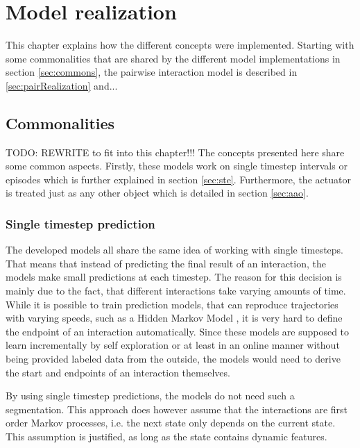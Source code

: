 \chapter{Model realization\label{chap:modelReal}}

This chapter explains how the different concepts were implemented. Starting 
with some commonalities that are shared by the different model implementations in section 
\ref{sec:commons}, the pairwise interaction model is described in 
\ref{sec:pairRealization} and... %


\section{Commonalities\label{sec:commons}}
TODO: REWRITE to fit into this chapter!!! %
The concepts presented here share some common aspects. Firstly, these models 
work on single timestep
intervals or episodes which is further explained in section \ref{sec:ste}. 
Furthermore, the actuator
is treated just as any other object which is detailed in section \ref{sec:aao}.

\subsection{Single timestep prediction\label{sec:ste}}

The developed models all share the same idea of working with single timesteps. That means that 
instead of predicting the final result of an interaction, the models make small predictions at each 
timestep. The reason for this decision is mainly due to the fact, that different interactions take 
varying amounts of time. While it is possible to train prediction models, that can reproduce 
trajectories with varying speeds, such as a Hidden Markov Model \cite{hmm}, it is very hard to 
define the endpoint of an interaction automatically. Since these models are supposed to learn 
incrementally by self exploration or at least in an online manner without being provided labeled 
data from the outside, the models would need to derive the start and endpoints of an interaction 
themselves.

By using single timestep predictions, the models do not need such a segmentation. This approach 
does however assume that the interactions are first order Markov processes, i.e. the next state 
only depends on the current state. This assumption is justified, as long as the state contains 
dynamic features.


%
%

